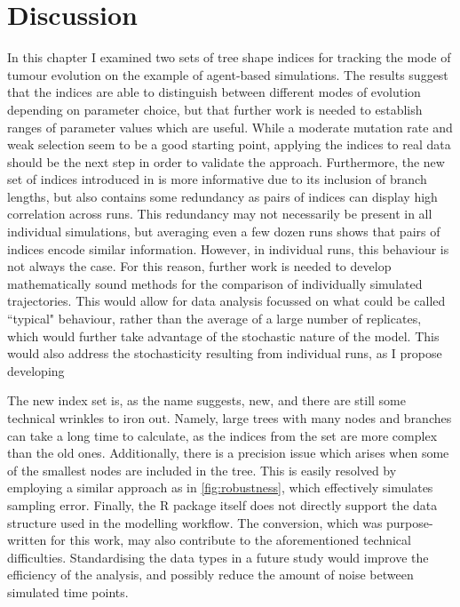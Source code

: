 \section{Discussion}
In this chapter I examined two sets of tree shape indices for tracking the mode
of tumour evolution on the example of agent-based simulations. The results
suggest that the indices are able to distinguish between different modes of
evolution depending on parameter choice, but that further work is needed to
establish ranges of parameter values which are useful. While a moderate
mutation rate and weak selection seem to be a good starting point, applying the
indices to real data should be the next step in order to validate the approach.
Furthermore, the new set of indices introduced in \cite{noble_new_2023} is more
informative due to its inclusion of branch lengths, but also contains some
redundancy as pairs of indices can display high correlation across runs. This
redundancy may not necessarily be present in all individual simulations, but
averaging even a few dozen runs shows that pairs of indices encode similar
information. However, in individual runs, this behaviour is not always the
case. For this reason, further work is needed to develop mathematically sound
methods for the comparison of individually simulated trajectories. This would
allow for data analysis focussed on what could be called ``typical" behaviour,
rather than the average of a large number of replicates, which would further
take advantage of the stochastic nature of the model. This would also address
the stochasticity resulting from individual runs, as I propose developing
 \par

The new index set is, as the name suggests, new, and there are still some
technical wrinkles to iron out. Namely, large trees with many nodes and
branches can take a long time to calculate, as the indices from the set are
more complex than the old ones. Additionally, there is a precision issue which
arises when some of the smallest nodes are included in the tree. This is easily
resolved by employing a similar approach as in \ref{fig:robustness}, which
effectively simulates sampling error. Finally, the R package itself does not
directly support the data structure used in the modelling workflow. The
conversion, which was purpose-written for this work, may also contribute to the
aforementioned technical difficulties. Standardising the data types in a future
study would improve the efficiency of the analysis, and possibly reduce the
amount of noise between simulated time points. \par

